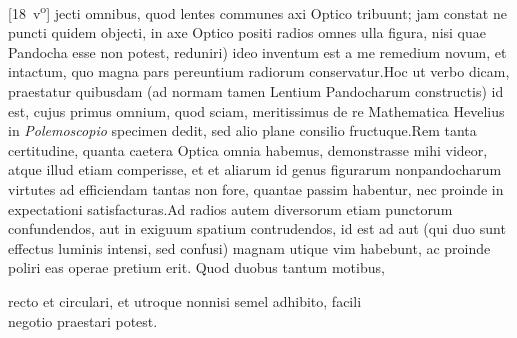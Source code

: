 [18~v\textsuperscript{o}] jecti omnibus, quod lentes\protect{} communes axi Optico\protect{} tribuunt; jam constat ne puncti quidem objecti, in axe Optico\protect{} positi radios omnes ulla figura, nisi quae Pandocha esse non potest, reduniri) ideo inventum est a me remedium novum, et intactum, quo magna pars pereuntium radiorum conservatur.\pend \pstart Hoc ut verbo dicam, praestatur \protect{}quibusdam  (ad normam tamen Lentium Pandocharum\protect{} constructis) id est, \protect{}\protect{} cujus primus omnium, quod sciam, meritissimus de re Mathematica Hevelius\protect{} in \textit{Polemoscopio} specimen dedit, sed alio plane consilio fructuque.\pend \pstart Rem tanta certitudine, quanta caetera Optica omnia habemus, demonstrasse mihi videor, atque illud etiam comperisse,  et  et aliarum id genus figurarum non\textendash pandocharum virtutes ad  efficiendam tantas non fore, quantae passim habentur, nec proinde in  expectationi satisfacturas.\pend\pstart Ad radios autem diversorum etiam punctorum confundendos, aut in exiguum spatium contrudendos, id est ad  aut  (qui duo sunt effectus luminis\protect{} intensi, sed confusi) magnam utique vim habebunt, ac proinde poliri eas operae pretium erit. Quod duobus tantum motibus,\pend\begin{center} recto et circulari, et utroque nonnisi semel adhibito, facili\\ negotio praestari potest.\end{center}